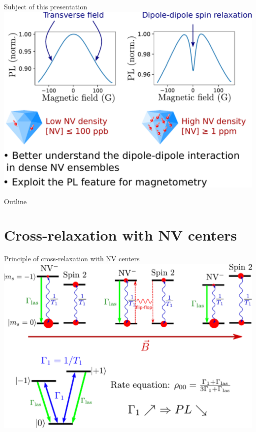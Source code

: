 \documentclass{beamer}
\begin{document}
\begin{frame}{Subject of this presentation}
\centering
\includegraphics[width=\textwidth,height=0.9\textheight,keepaspectratio]{slide_presentation_sujet}
\end{frame}

\begin{frame}{Outline}
\tableofcontents
\end{frame}

\section{Cross-relaxation with NV centers}
\begin{frame}{Principle of cross-relaxation with NV centers}
\centering
\includegraphics[width=\textwidth,height=0.8\textheight,keepaspectratio]{Slide_CR_presentation}
\end{frame}
\end{document}
